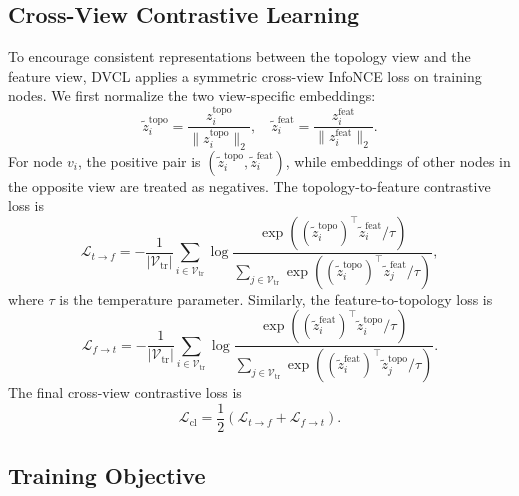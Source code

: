 \subsection{Cross-View Contrastive Learning}

To encourage consistent representations between the topology view and the feature view, DVCL applies a symmetric cross-view InfoNCE loss on training nodes. We first normalize the two view-specific embeddings:
\begin{equation}
\tilde{z}_i^{\mathrm{topo}}
=
\frac{z_i^{\mathrm{topo}}}{\|z_i^{\mathrm{topo}}\|_2},
\quad
\tilde{z}_i^{\mathrm{feat}}
=
\frac{z_i^{\mathrm{feat}}}{\|z_i^{\mathrm{feat}}\|_2}.
\end{equation}
For node $v_i$, the positive pair is
$(\tilde{z}_i^{\mathrm{topo}},\tilde{z}_i^{\mathrm{feat}})$, while embeddings of other nodes in the opposite view are treated as negatives. The topology-to-feature contrastive loss is
\begin{equation}
\mathcal{L}_{t\rightarrow f}
=
-\frac{1}{|\mathcal{V}_{\mathrm{tr}}|}
\sum_{i\in\mathcal{V}_{\mathrm{tr}}}
\log
\frac{
\exp((\tilde{z}_i^{\mathrm{topo}})^{\top}
\tilde{z}_i^{\mathrm{feat}}/\tau)
}
{
\sum_{j\in\mathcal{V}_{\mathrm{tr}}}
\exp((\tilde{z}_i^{\mathrm{topo}})^{\top}
\tilde{z}_j^{\mathrm{feat}}/\tau)
},
\end{equation}
where $\tau$ is the temperature parameter. Similarly, the feature-to-topology loss is
\begin{equation}
\mathcal{L}_{f\rightarrow t}
=
-\frac{1}{|\mathcal{V}_{\mathrm{tr}}|}
\sum_{i\in\mathcal{V}_{\mathrm{tr}}}
\log
\frac{
\exp((\tilde{z}_i^{\mathrm{feat}})^{\top}
\tilde{z}_i^{\mathrm{topo}}/\tau)
}
{
\sum_{j\in\mathcal{V}_{\mathrm{tr}}}
\exp((\tilde{z}_i^{\mathrm{feat}})^{\top}
\tilde{z}_j^{\mathrm{topo}}/\tau)
}.
\end{equation}
The final cross-view contrastive loss is
\begin{equation}
\mathcal{L}_{\mathrm{cl}}
=
\frac{1}{2}
(
\mathcal{L}_{t\rightarrow f}
+
\mathcal{L}_{f\rightarrow t}
).
\end{equation}

\subsection{Training Objective}

